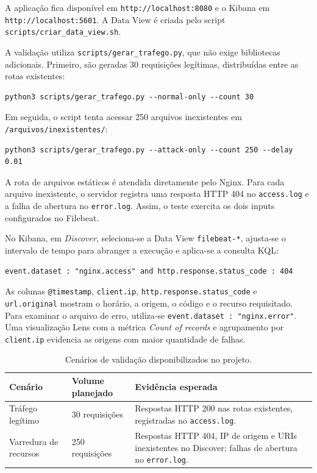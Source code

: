 \documentclass[10pt,a4paper]{article}
\begin{document}
A aplicação fica disponível em \texttt{http://localhost:8080} e o Kibana em \texttt{http://localhost:5601}. A Data View é criada pelo script \texttt{scripts/criar\_data\_view.sh}.

A validação utiliza \texttt{scripts/gerar\_trafego.py}, que não exige bibliotecas adicionais. Primeiro, são geradas 30 requisições legítimas, distribuídas entre as rotas existentes:

\begin{lstlisting}
python3 scripts/gerar_trafego.py --normal-only --count 30
\end{lstlisting}

Em seguida, o script tenta acessar 250 arquivos inexistentes em \texttt{/arquivos/inexistentes/}:

\begin{lstlisting}
python3 scripts/gerar_trafego.py --attack-only --count 250 --delay 0.01
\end{lstlisting}

A rota de arquivos estáticos é atendida diretamente pelo Nginx. Para cada arquivo inexistente, o servidor registra uma resposta HTTP 404 no \texttt{access.log} e a falha de abertura no \texttt{error.log}. Assim, o teste exercita os dois inputs configurados no Filebeat.

No Kibana, em \textit{Discover}, seleciona-se a Data View \texttt{filebeat-*}, ajusta-se o intervalo de tempo para abranger a execução e aplica-se a consulta KQL:

\begin{lstlisting}
event.dataset : "nginx.access" and http.response.status_code : 404
\end{lstlisting}

As colunas \texttt{@timestamp}, \texttt{client.ip}, \texttt{http.response.status\_code} e \texttt{url.original} mostram o horário, a origem, o código e o recurso requisitado. Para examinar o arquivo de erro, utiliza-se \texttt{event.dataset : "nginx.error"}. Uma visualização Lens com a métrica \textit{Count of records} e agrupamento por \texttt{client.ip} evidencia as origens com maior quantidade de falhas.

\begin{table}[H]
\centering
\small
\caption{Cenários de validação disponibilizados no projeto.}
\begin{tabularx}{\linewidth}{>{\raggedright\arraybackslash}p{3.2cm} p{2.5cm} X}
\toprule
\textbf{Cenário} & \textbf{Volume planejado} & \textbf{Evidência esperada} \\
\midrule
Tráfego legítimo & 30 requisições & Respostas HTTP 200 nas rotas existentes, registradas no \texttt{access.log}. \\
Varredura de recursos & 250 requisições & Respostas HTTP 404, IP de origem e URIs inexistentes no Discover; falhas de abertura no \texttt{error.log}. \\
\bottomrule
\end{tabularx}
\end{table}
\end{document}
